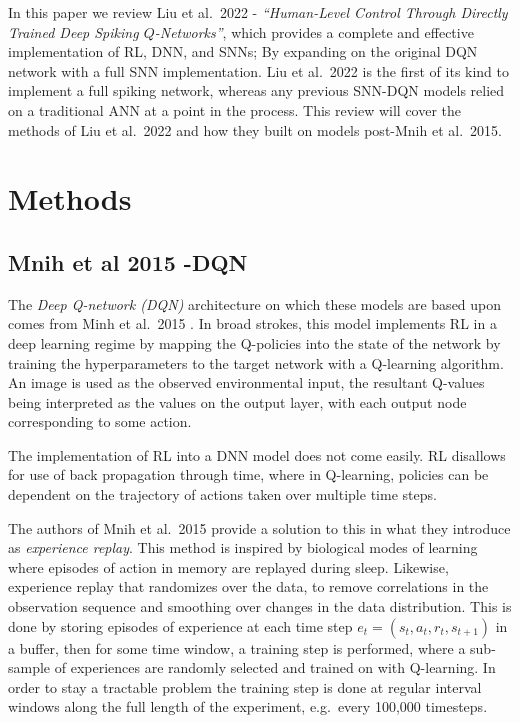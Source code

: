 \documentclass[
]{article}
\begin{document}
In this paper we review Liu et al.~2022 - \emph{``Human-Level Control
Through Directly Trained Deep Spiking \(Q\)-Networks''}, which provides
a complete and effective implementation of RL, DNN, and SNNs; By
expanding on the original DQN network
\autocite{mnihHumanlevelControlDeep2015} with a full SNN
implementation. Liu et al.~2022 is the first of its kind to implement a
full spiking network, whereas any previous SNN-DQN models relied on a
traditional ANN at a point in the process. This review will cover the
methods of Liu et al.~2022 and how they built on models post-Mnih et
al.~2015.

\hypertarget{methods}{%
\section{Methods}\label{methods}}

\hypertarget{mnih-et-al-2015--dqn}{%
\subsection{Mnih et al 2015 -DQN}\label{mnih-et-al-2015--dqn}}

The \emph{Deep Q-network (DQN)} architecture on which these models are
based upon comes from Minh et al.~2015
\autocite{mnihHumanlevelControlDeep2015}. In broad strokes, this
model implements RL in a deep learning regime by mapping the Q-policies
into the state of the network by training the hyperparameters to the
target network with a Q-learning algorithm. An image is used as the
observed environmental input, the resultant Q-values being interpreted
as the values on the output layer, with each output node corresponding
to some action.

The implementation of RL into a DNN model does not come easily. RL
disallows for use of back propagation through time, where in Q-learning,
policies can be dependent on the trajectory of actions taken over
multiple time steps.

The authors of Mnih et al.~2015 provide a solution to this in what they
introduce as \emph{experience replay}. This method is inspired by
biological modes of learning where episodes of action in memory are
replayed during sleep. Likewise, experience replay that randomizes over
the data, to remove correlations in the observation sequence and
smoothing over changes in the data distribution. This is done by storing
episodes of experience at each time step
\(e_{t}= (s_{t} , a_{t}, r_{t}, s_{t+1})\) in a buffer, then for some
time window, a training step is performed, where a sub-sample of
experiences are randomly selected and trained on with Q-learning. In
order to stay a tractable problem the training step is done at regular
interval windows along the full length of the experiment, e.g.~every
100,000 timesteps.
\end{document}
